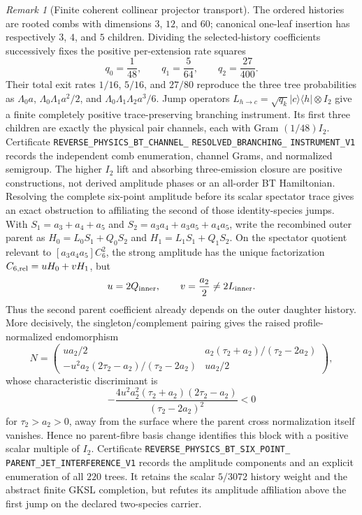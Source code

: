 \documentclass[11pt]{article}
\theoremstyle{definition}
\theoremstyle{remark}
\newtheorem{remark}[theorem]{Remark}
\begin{document}
\begin{remark}[Finite coherent collinear projector transport]
The ordered histories are rooted combs with dimensions $3$, $12$, and $60$;
canonical one-leaf insertion has respectively $3$, $4$, and $5$ children.
Dividing the selected-history coefficients successively fixes the positive
per-extension rate squares
\[
 q_0=\frac1{48},\qquad q_1=\frac5{64},\qquad
 q_2=\frac{27}{400}.
\]
Their total exit rates $1/16$, $5/16$, and $27/80$ reproduce the three tree
probabilities as $\Lambda_0a$,
$\Lambda_0\Lambda_1a^2/2$, and
$\Lambda_0\Lambda_1\Lambda_2a^3/6$.  Jump operators
$L_{h\to c}=\sqrt{q_k}|c\rangle\langle h|\otimes I_2$ give a finite
completely positive trace-preserving branching instrument.  Its first three
children are exactly the physical pair channels, each with Gram
$(1/48)I_2$.  Certificate
\texttt{REVERSE\_PHYSICS\_BT\_CHANNEL\_}
\allowbreak\texttt{RESOLVED\_BRANCHING\_}
\allowbreak\texttt{INSTRUMENT\_V1}
records the independent comb enumeration, channel Grams, and normalized
semigroup.  The higher $I_2$ lift and absorbing three-emission closure are
positive constructions, not derived amplitude phases or an all-order BT
Hamiltonian.  Resolving the complete six-point amplitude before its scalar
spectator trace gives an exact obstruction to affiliating the second of those
identity-species jumps.  With
$S_1=a_3+a_4+a_5$ and
$S_2=a_3a_4+a_3a_5+a_4a_5$, write the recombined outer parent as
$H_0=L_0S_1+Q_0S_2$ and $H_1=L_1S_1+Q_1S_2$.  On the spectator quotient
relevant to $[a_3a_4a_5]C_6^2$, the strong amplitude has the unique
factorization $C_{6,{\rm rel}}=uH_0+vH_1$, but
\[
 u=2Q_{\rm inner},\qquad v=\frac{a_2}{2}\ne2L_{\rm inner}.
\]
Thus the second parent coefficient already depends on the outer daughter
history.  More decisively, the singleton/complement pairing gives the raised
profile-normalized endomorphism
\[
 N=\begin{pmatrix}
 ua_2/2 & a_2(\tau_2+a_2)/(\tau_2-2a_2)\\
 -u^2a_2(2\tau_2-a_2)/(\tau_2-2a_2)&ua_2/2
 \end{pmatrix},
\]
whose characteristic discriminant is
\[
 -\frac{4u^2a_2^2(\tau_2+a_2)(2\tau_2-a_2)}
 {(\tau_2-2a_2)^2}<0
\]
for $\tau_2>a_2>0$, away from the surface where the parent cross
normalization itself vanishes.  Hence no parent-fibre basis change identifies
this block with a positive scalar multiple of $I_2$.  Certificate
\texttt{REVERSE\_PHYSICS\_BT\_SIX\_POINT\_}
\allowbreak\texttt{PARENT\_JET\_INTERFERENCE\_V1}
records the amplitude components and an explicit enumeration of all $220$
trees.  It retains the scalar $5/3072$ history weight and the abstract finite
GKSL completion, but refutes its amplitude affiliation above the first jump
on the declared two-species carrier.


\end{remark}
\end{document}
